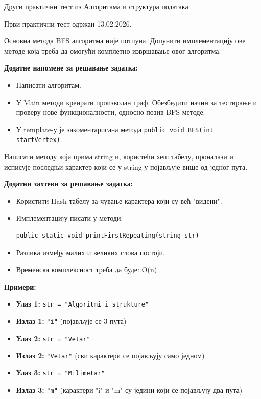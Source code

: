 
Други практични тест из Алгоритама и структура података

Први практични тест одржан 13.02.2026.

Основна метода BFS алгоритма није потпуна. Допунити имплементацију ове методе која треба да омогући комплетно извршавање овог алгоритма.

\textbf{Додатне напомене за решавање задатка:}
\begin{itemize}
	\item Написати алгоритам.
	\item У Main методи креирати произволан граф. Обезбедити начин за тестирање и проверу нове функционалности, односно позив BFS методе.
	\item У template-у је закоментарисана метода \texttt{public void BFS(int startVertex)}.
\end{itemize}

Написати методу која прима string и, користећи хеш табелу, проналази и исписује последњи карактер који се у string-у појављује више од једног пута.

\textbf{Додатни захтеви за решавање задатка:}
\begin{itemize}
	\item Користити Hash табелу за чување карактера који су већ "видени".
	\item Имплементацију писати у методи:
	\begin{Verbatim}[fontsize=\small]
public static void printFirstRepeating(string str)
	\end{Verbatim}
	\item Разлика између малих и великих слова постоји.
	\item Временска комплексност треба да буде: O(n)
\end{itemize}

\textbf{Примери:}
\begin{itemize}
	\item \textbf{Улаз 1:} \texttt{str = "Algoritmi i strukture"}
	\item \textbf{Излаз 1:} \texttt{"i"} (појављује се 3 пута)
	\item \textbf{Улаз 2:} \texttt{str = "Vetar"}
	\item \textbf{Излаз 2:} \texttt{"Vetar"} (сви карактери се појављују само једном)
	\item \textbf{Улаз 3:} \texttt{str = "Milimetar"}
	\item \textbf{Излаз 3:} \texttt{"m"} (карактери "i" и "m" су једини који се појављују два пута)
\end{itemize}

